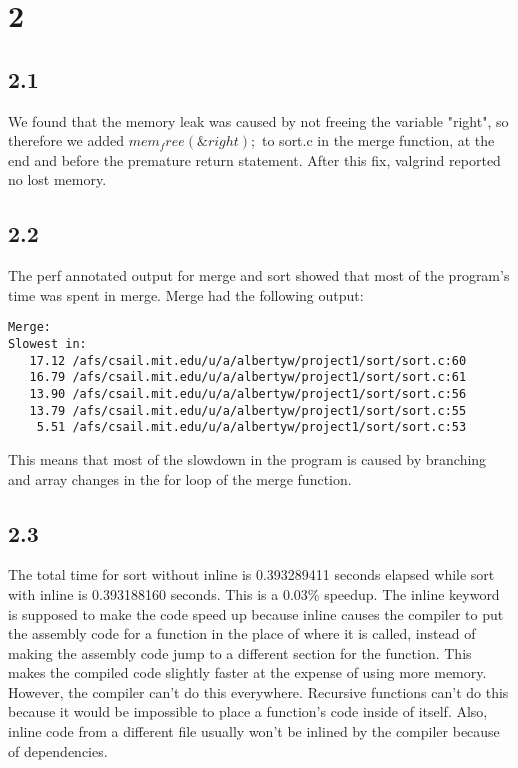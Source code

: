 \documentclass[12pt]{article}
\begin{document}
\maketitle
\section{2}
\subsection{2.1}
We found that the memory leak was caused by not freeing the variable "right", 
so therefore we added $mem_free(\&right);$ to sort.c in the merge function, at 
the end and before the premature return statement.  After this fix, valgrind 
reported no lost memory.  

\subsection{2.2}
The perf annotated output for merge and sort showed that most of the program's 
time was spent in merge.  Merge had the following output:
\begin{verbatim}
Merge:
Slowest in:
   17.12 /afs/csail.mit.edu/u/a/albertyw/project1/sort/sort.c:60
   16.79 /afs/csail.mit.edu/u/a/albertyw/project1/sort/sort.c:61
   13.90 /afs/csail.mit.edu/u/a/albertyw/project1/sort/sort.c:56
   13.79 /afs/csail.mit.edu/u/a/albertyw/project1/sort/sort.c:55
    5.51 /afs/csail.mit.edu/u/a/albertyw/project1/sort/sort.c:53
\end{verbatim}
This means that most of the slowdown in the program is caused by branching and 
array changes in the for loop of the merge function.  

\subsection{2.3}
The total time for sort without inline is 0.393289411 seconds elapsed while 
sort with inline is 0.393188160 seconds.  This is a 0.03\% speedup.  
The inline keyword is supposed to make the code speed up because inline 
causes the compiler to put the assembly code for a function in the place of 
where it is called, instead of making the assembly code jump to a different 
section for the function.  This makes the compiled code slightly faster at the 
expense of using more memory.  
However, the compiler can't do this everywhere.  
Recursive functions can't do this because it would be impossible to place a 
function's code inside of itself.  Also, inline code from a different file 
usually won't be inlined by the compiler because of dependencies.  
\end{document}
